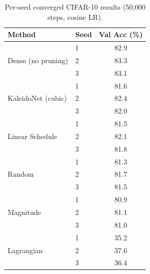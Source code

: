 \begin{table}[h]
\centering
\caption{Per-seed converged CIFAR-10 results (50{,}000 steps, cosine LR).}
\label{tab:per_seed_cifar10}
\small
\begin{tabular}{llc}
\toprule
\textbf{Method} & \textbf{Seed} & \textbf{Val Acc (\%)} \\
\midrule
\multirow{3}{*}{Dense (no pruning)} & 1 & 82.9 \\
& 2 & 83.3 \\
& 3 & 83.1 \\
\midrule
\multirow{3}{*}{KaleidoNet (cubic)} & 1 & 81.6 \\
& 2 & 82.4 \\
& 3 & 82.0 \\
\midrule
\multirow{3}{*}{Linear Schedule} & 1 & 81.5 \\
& 2 & 82.1 \\
& 3 & 81.8 \\
\midrule
\multirow{3}{*}{Random} & 1 & 81.3 \\
& 2 & 81.7 \\
& 3 & 81.5 \\
\midrule
\multirow{3}{*}{Magnitude} & 1 & 80.9 \\
& 2 & 81.1 \\
& 3 & 81.0 \\
\midrule
\multirow{3}{*}{Lagrangian} & 1 & 35.2 \\
& 2 & 37.6 \\
& 3 & 36.4 \\
\bottomrule
\end{tabular}
\end{table}

